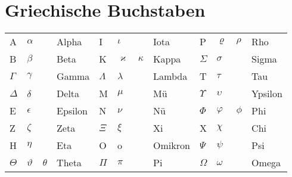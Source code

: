 \section{Griechische Buchstaben}
	\renewcommand{\arraystretch}{1.5}
	\begin{tabular}{| p{0.7cm} p{0.7cm} p{0.7cm} p{2cm} | p{0.7cm} p{0.7cm} p{0.7cm} p{2cm} | p{0.7cm} p{0.7cm} p{0.7cm} p{2cm} | }
		\hline
		A & $\alpha$ & & Alpha & I & $\iota$ & & Iota & P & $\varrho$ & $\rho$ & Rho\\
		B & $\beta$ & & Beta & K & $\varkappa$ & $\kappa$ & Kappa & $\Sigma$ & $\sigma$ & & Sigma\\
		$\Gamma$ & $\gamma$ & & Gamma & $\Lambda$ & $\lambda$ & & Lambda & T & $\tau$ & & Tau\\
		$\Delta$ & $\delta$ & & Delta & M & $\mu$ & & Mü & $\Upsilon$ & $\upsilon$ & & Ypsilon\\
		E & $\epsilon$ & & Epsilon & N & $\nu$ & & Nü & $\Phi$ & $\varphi$ & $\phi$ & Phi \\
		Z & $\zeta$ & & Zeta & $\Xi$ & $\xi$ & & Xi & X & $\chi$ & & Chi \\
		H & $\eta$ & & Eta & O & o & & Omikron & $\Psi$ & $\psi$ & & Psi\\
		$\Theta$ & $\vartheta$ & $\theta$ & Theta & $\Pi$ & $\pi$ & & Pi & $\Omega$ & $\omega$ & & Omega \\
		\hline
	\end{tabular}
	\renewcommand{\arraystretch}{1}	